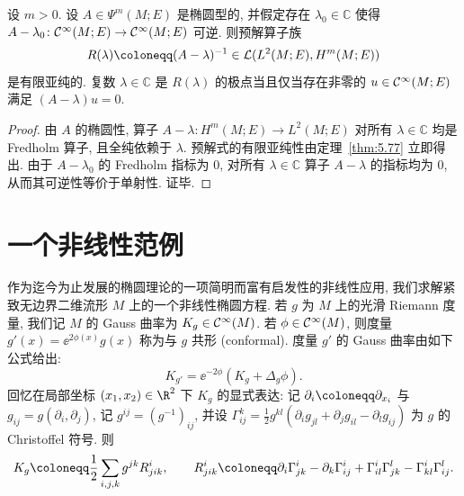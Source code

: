 \begin{theorem}[预解算子族的有限亚纯性]\label{thm:5.78}
设 $m > 0$. 设 $A \in \Psi^m(M; E)$ 是椭圆型的, 并假定存在 $\lambda_0 \in \mathbb{C}$ 使得 $A - \lambda_0 \colon \mathcal{C}^\infty(M; E) \to \mathcal{C}^\infty(M; E)$ 可逆. 则预解算子族
\begin{equation}\label{eq:5.173}
    R(\lambda) \defeq (A - \lambda)^{-1} \in \mathcal{L}(L^2(M; E), H^m(M; E))
\end{equation}
是有限亚纯的. 复数 $\lambda \in \mathbb{C}$ 是 $R(\lambda)$ 的极点当且仅当存在非零的 $u \in \mathcal{C}^\infty(M; E)$ 满足 $(A - \lambda) u = 0$.
\end{theorem}

\begin{proof}
由 $A$ 的椭圆性, 算子 $A - \lambda \colon H^m(M; E) \to L^2(M; E)$ 对所有 $\lambda \in \mathbb{C}$ 均是 Fredholm 算子, 且全纯依赖于 $\lambda$. 预解式的有限亚纯性由定理~\ref{thm:5.77} 立即得出. 由于 $A - \lambda_0$ 的 Fredholm 指标为 0, 对所有 $\lambda \in \mathbb{C}$ 算子 $A - \lambda$ 的指标均为 0, 从而其可逆性等价于单射性. 证毕.
\end{proof}

\section{一个非线性范例}\label{sec:5.13}
%
%

作为迄今为止发展的椭圆理论的一项简明而富有启发性的非线性应用, 我们求解紧致无边界二维流形 $M$ 上的一个非线性椭圆方程. 若 $g$ 为 $M$ 上的光滑 Riemann 度量, 我们记 $M$ 的 Gauss 曲率为 $K_g \in \mathcal{C}^\infty(M)$. 若 $\phi \in \mathcal{C}^\infty(M)$, 则度量 $g'(x) = \ee^{2\phi(x)} g(x)$ 称为与 $g$ 共形 (conformal). 度量 $g'$ 的 Gauss 曲率由如下公式给出:
\begin{equation}\label{eq:5.174}
    K_{g'} = \ee^{-2\phi} (K_g + \Delta_g \phi).
\end{equation}
回忆在局部坐标 $(x_1, x_2) \in \R^2$ 下 $K_g$ 的显式表达: 记 $\partial_i \defeq \partial_{x_i}$ 与 $g_{ij} = g(\partial_i, \partial_j)$, 记 $g^{ij} = (g^{-1})_{ij}$, 并设 $\Gamma_{ij}^k = \frac{1}{2} g^{kl}(\partial_i g_{jl} + \partial_j g_{il} - \partial_l g_{ij})$ 为 $g$ 的 Christoffel 符号. 则
\begin{equation}\label{eq:5.175}
    K_g \defeq \frac{1}{2} \sum_{i,j,k} g^{jk} R_{jik}^i, \qquad R_{jik}^i \defeq \partial_i \Gamma_{jk}^i - \partial_k \Gamma_{ij}^i + \Gamma_{il}^i \Gamma_{jk}^l - \Gamma_{kl}^i \Gamma_{ij}^l.
\end{equation}

